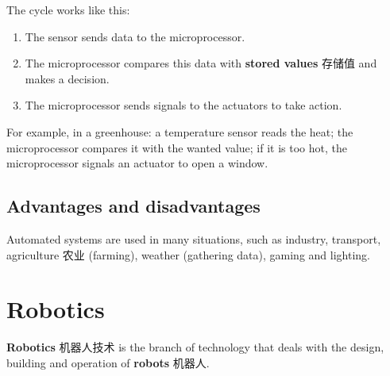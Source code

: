 \documentclass[11pt]{article}
\begin{document}
The cycle works like this:

\begin{enumerate}
\item The sensor sends data to the microprocessor.

\item The microprocessor compares this data with \textbf{stored values} 存储值 and makes a decision.

\item The microprocessor sends signals to the actuators to take action.

\end{enumerate}

For example, in a greenhouse: a temperature sensor reads the heat; the microprocessor compares it with the wanted value; if it is too hot, the microprocessor signals an actuator to open a window.

\subsection*{Advantages and disadvantages}

Automated systems are used in many situations, such as industry, transport, agriculture 农业 (farming), weather (gathering data), gaming and lighting.

\begin{center}
\end{center}

\section*{Robotics}

\textbf{Robotics} 机器人技术 is the branch of technology that deals with the design, building and operation of \textbf{robots} 机器人.
\end{document}
